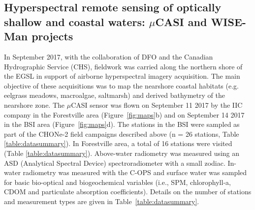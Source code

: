 \documentclass[essd, manuscript]{copernicus}
\begin{document}
\subsection{Hyperspectral remote sensing of optically shallow and coastal waters: $\mu$CASI and WISE-Man projects}
In September 2017, with the collaboration of DFO and the Canadian Hydrographic Service (CHS), fieldwork was carried along the northern shore of the EGSL in support of airborne hyperspectral imagery acquisition. The main objective of these acquisitions was to map the nearshore coastal habitats (e.g. eelgrass meadows, macroalgae, saltmarsh) and derived bathymetry of the nearshore zone. The $\mu$CASI sensor was flown on September 11 2017 by the IIC company in the Forestville area (Figure~\ref{fig:maps}b) and on September 14 2017 in the BSI area (Figure~\ref{fig:maps}d). The stations in the BSI were sampled as part of the CHONe-2 field campaigns described above (n = 26 stations, Table \ref{table:datasummary}). In Forestville area,  a total of 16 stations were visited (Table \ref{table:datasummary}). Above-water radiometry was measured using an ASD (Analytical Spectral Device) spectroradiometer with a small zodiac. In-water radiometry was measured with the C-OPS and surface water was sampled for basic bio-optical and biogeochemical variables (i.e., SPM, chlorophyll-a, CDOM and particulate absorption coefficients). Details on the number of stations and measurement types are given in Table~\ref{table:datasummary}.\\
 
\end{document}
